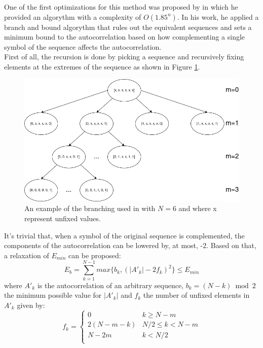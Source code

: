   One of the first optimizations for this method was
  proposed by \citet{Mertens_1996} in which he provided an algorythm
  with a complexity of $O(1.85^n)$. In his work, he applied a branch and bound
  algorythm that rules out the equivalent sequences and sets a minimum bound
  to the autocorrelation based on how complementing a single symbol of the
  sequence affects the autocorrelation.\\

  First of all, the recursion is done by picking a sequence and recursively
  fixing elements at the extremes of the sequence as shown in Figure
  \ref{prn_search:fig:1}.\\

  \begin{figure}[ht!]
    \includegraphics[scale=0.6]{Chapters/prn_search/branching_example.png}
    \caption{An example of the branching used in \citet{Mertens_1996} with
    $N = 6$ and where x represent unfixed values.}
    \label{prn_search:fig:1}
  \end{figure}

  It's trivial that, when a symbol of the original sequence is complemented,
  the components of the autocorrelation can be lowered by, at most, -2. Based on
  that, a relaxation of $E_{min}$ can be proposed:\\
  \begin{equation}
    E_b = \sum_{k=1}^{N-1}max\{b_k, (|A'_k| - 2f_k)^2\} \leq E_{min}
  \end{equation}
  where $A'_k$ is the autocorrelation of an arbitrary sequence, $b_k = (N -
  k) \bmod 2$ the minimum possible value for $|A'_k|$ and $f_k$ the number of
  unfixed elements in $A'_k$ given by:
  \begin{equation}
    f_k = \left\{\begin{array}{ll}
        0 & k \geq N - m \\
        2(N - m - k) & N/2 \leq k < N - m\\
        N - 2m & k < N/2 \\
    \end{array}\right.
  \end{equation}

